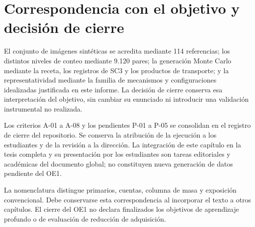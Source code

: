 \documentclass[11pt,a4paper]{article}
\begin{document}
\appendix
\section{Correspondencia con el objetivo y decisión de cierre}

El conjunto de imágenes sintéticas se acredita mediante 114 referencias; los distintos niveles de conteo mediante 9.120 pares; la generación Monte Carlo mediante la receta, los registros de SC3 y los productos de transporte; y la representatividad mediante la familia de mecanismos y configuraciones idealizadas justificada en este informe. La decisión de cierre conserva esa interpretación del objetivo, sin cambiar su enunciado ni introducir una validación instrumental no realizada.

Los criterios A-01 a A-08 y los pendientes P-01 a P-05 se consolidan en el registro de cierre del repositorio. Se conserva la atribución de la ejecución a los estudiantes y de la revisión a la dirección. La integración de este capítulo en la tesis completa y su presentación por los estudiantes son tareas editoriales y académicas del documento global; no constituyen nueva generación de datos pendiente del OE1.

La nomenclatura distingue primarios, cuentas, columna de masa y exposición convencional. Debe conservarse esta correspondencia al incorporar el texto a otros capítulos. El cierre del OE1 no declara finalizados los objetivos de aprendizaje profundo o de evaluación de reducción de adquisición.
\end{document}
